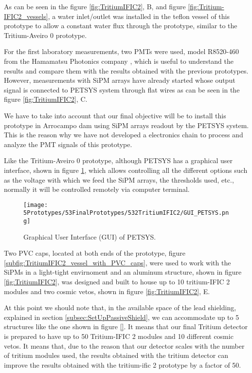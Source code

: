As can be seen in the figure \ref{fig:TritiumIFIC2}, B, and figure \ref{fig:Tritium-IFIC2_vessels}, a water inlet/outlet was installed in the teflon vessel of this prototype to allow a constant water flux through the prototype, similar to the Tritium-Aveiro 0 prototype.

For the first laboratory measurements, two PMTs were used, model R8520-460 from the Hamamatsu Photonics company \cite{DataSheetPMTs}, which is useful to understand the results and compare them with the results obtained with the previous prototypes. However, measurements with SiPM arrays have already started whose output signal is connected to PETSYS system through flat wires as can be seen in the figure \ref{fig:TritiumIFIC2}, C.

We have to take into account that our final objective will be to install this prototype in Arrocampo dam using SiPM arrays readout by the PETSYS system. This is the reason why we have not developed a electronics chain to process and analyze the PMT signals of this prototype.

Like the Tritium-Aveiro 0 prototype, although PETSYS has a graphical user interface, shown in figure \ref{fig:GUI_PETSYS}, which allows controlling all the different options such as the voltage with which we feed the SiPM arrays, the thresholds used, etc., normally it will be controlled remotely via computer terminal. 

\begin{figure}[h]
\centering
\texttt{[image: 5Prototypes/53FinalPrototypes/532TritiumIFIC2/GUI\_PETSYS.png]}
\caption{Graphical User Interface (GUI) of PETSYS.\label{fig:GUI_PETSYS}}
\end{figure}

Two PVC caps, located at both ends of the prototype, figure \ref{subfig:TritiumIFIC2_vessel_with_PVC_caps}, were used to work with the SiPMs in a light-tight envirnoment and an aluminum structure, shown in figure \ref{fig:TritiumIFIC2}, was designed and built to house up to 10 tritium-IFIC 2 modules and two cosmic vetos, shown in figure \ref{fig:TritiumIFIC2}, E.

At this point we should note that, in the available space of the lead shielding, explained in section \ref{subsec:SetUpPassiveShield}, we can accommodate up to 5 structures like the one shown in figure \ref{}. It means that our final Tritium detector is prepared to have up to 50 Tritium-IFIC 2 modules and 10 different cosmic vetos. It means that, due to the reason that our detector scales with the number of tritium modules used, the results obtained with the tritium detector can improve the results obtained with the tritium-ific 2 prototype by a factor of 50.


